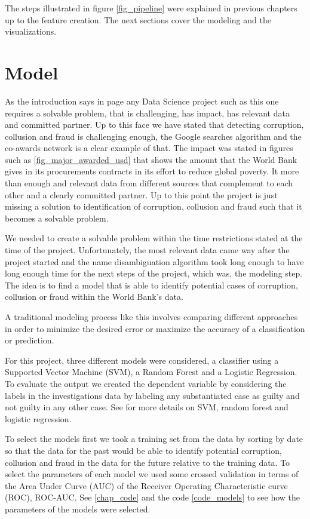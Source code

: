 The steps illustrated  in figure \ref{fig_pipeline} were explained in previous chapters up to the feature creation. The next sections cover the modeling and the visualizations.

\section{Model} \label{sec_models}

As the introduction says in page \pageref{dssg} any Data Science project such as this one requires a solvable problem, that is challenging, has impact, has relevant data and committed partner. Up to this face we have stated that detecting corruption, collusion and fraud  is challenging enough, the Google searches algorithm and the co-awards network is a clear example of that. The impact was stated in figures such as \ref{fig_major_awarded_usd} that shows the amount that the World Bank gives in its procurements contracts in its effort to reduce global poverty. It more than enough and relevant data  from different sources that complement to each other and a clearly committed partner. Up to this point the project is just missing a solution to identification of corruption, collusion and fraud such that it becomes a solvable problem.  

We needed to create a solvable problem within the time restrictions stated at the time of the project. Unfortunately, the most relevant data came way after the project started and the name disambiguation algorithm took long enough to have long enough time for the next steps of the project, which was, the modeling step. The idea is to find a model that is able to identify potential cases of corruption, collusion or fraud within the World Bank's data. 

A traditional modeling process like this involves comparing different approaches in order to minimize the desired error or maximize the accuracy of a classification or prediction.


For this project, three different models were considered, a classifier  using a Supported Vector Machine (SVM), a Random Forest and a Logistic Regression. To evaluate the output we created the dependent variable by considering the labels in the investigations data by labeling any substantiated case as guilty and not guilty in any other case. See \cite{hasti} for more details on SVM, random forest and logistic regression. 


To select the models first we took a training set from the data by sorting by date so that the data for the past would be able to identify potential corruption, collusion and fraud in the data for the future relative to the training data. To select the parameters of each model we used some crossed validation in terms of the Area Under Curve (AUC) of the Receiver Operating Characteristic curve (ROC), ROC-AUC. See \ref{chap_code} and the code \ref{code_models} to see how the parameters of the models were selected.

